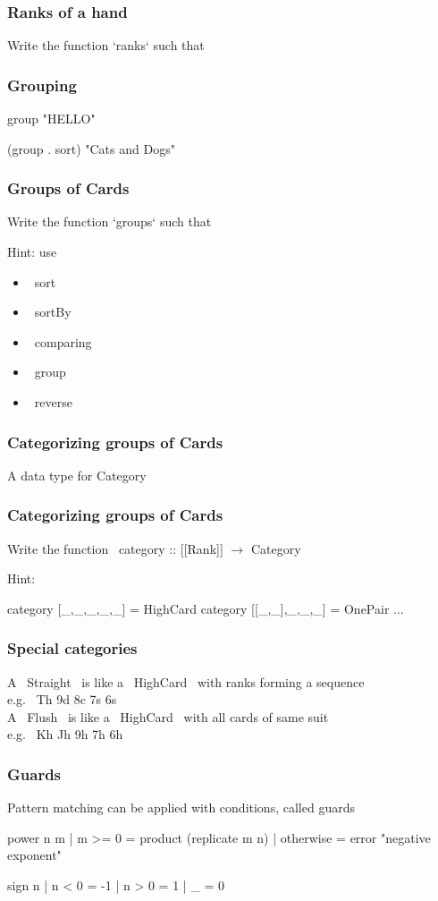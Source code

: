 \documentclass[11pt,xcolor={dvipsnames}]{beamer}
\newcommand{\tc}{\textcolor}
\newcommand{\key}[1]{\tc{orange}{#1}}
\newcommand{\rk}{\enskip{\key{$\hookleftarrow$}}}
\newcommand{\vs}{\vspace{1em}}
\newcommand{\lstH}[1]{}
\newcommand{\lstT}[1]{}
\begin{document}
\begin{frame}[fragile]
\frametitle{Ranks of a hand}
Write the function `ranks` such that
\lstT{036}
\end{frame}
\begin{frame}[fragile]
\frametitle{Grouping}
\begin{term}
group "HELLO"\rk
    
(group . sort) "Cats and Dogs"\rk
\end{term}
\end{frame}
\begin{frame}[fragile]
\frametitle{Groups of Cards}
Write the function `groups` such that
\lstT{038}
Hint: use
\begin{itemize}
\item  ~sort~
\item  ~sortBy~
\item  ~comparing~
\item  ~group~
\item  ~reverse~
\end{itemize}
\end{frame}
\begin{frame}[fragile]
\frametitle{Categorizing groups of Cards}
A data type for Category
\lstH{039}
\end{frame}
\begin{frame}[fragile]
\frametitle{Categorizing groups of Cards}
Write the function
 ~category :: [[Rank]] $\rightarrow$ Category~
\lstT{040}
Hint:
\begin{haskell}
category [_,_,_,_,_]   = HighCard
category [[_,_],_,_,_] = OnePair
...
\end{haskell}
\end{frame}
\begin{frame}[fragile]
\frametitle{Special categories}
A ~Straight~ is like a ~HighCard~ with ranks forming a sequence\\
\vs
e.g. ~Th 9d 8c 7s 6s~\\
\vs
A ~Flush~ is like a ~HighCard~ with all cards of same suit\\
\vs
e.g. ~Kh Jh 9h 7h 6h~
\end{frame}
\begin{frame}[fragile]
\frametitle{Guards}
Pattern matching can be applied with conditions, called guards
\begin{haskell}
power n m | m >= 0    = product (replicate m n)
          | otherwise = error "negative exponent"   

sign n | n < 0 = -1
       | n > 0 =  1
       | _     =  0
\end{haskell}
\end{frame}
\end{document}

